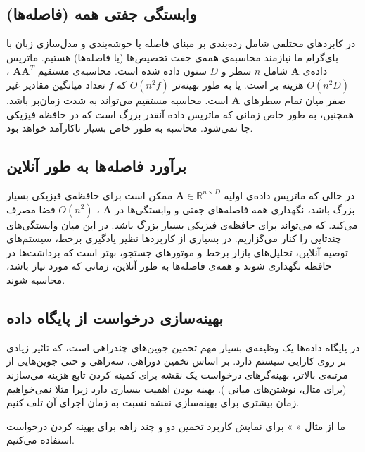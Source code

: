 \subsection{
وابستگی جفتی همه (فاصله‌ها)
}
در کابردهای مختلفی شامل رده‌بندی بر مبنای فاصله یا خوشه‌بندی و مدل‌سازی زبان با بای‌گرام%
\cite{litez48}
ما نیازمند محاسبه‌ی همه‌ی جفت تخصیص‌ها (یا فاصله‌ها) هستیم. ماتریس داده‌ی 
$\mathbf{A}$
شامل 
$n$
سطر و 
$D$
ستون داده شده است. محاسبه‌ی مستقیم
$\mathbf{AA}^T$
،
$O(n^2 D)$
هزینه بر است. یا به طور بهینه‌تر 
$O(n^2 \bar{f})$
که 
$\bar{f}$
تعداد میانگین مقادیر غیر صفر میان تمام سطرهای 
‌$\mathbf{A}$
است. محاسبه مستقیم می‌تواند به شدت زمان‌بر باشد. همچنین، به طور خاص زمانی که ماتریس داده آنقدر بزرگ است که در حافظه فیزیکی جا نمی‌شود. محاسبه به طور خاص بسیار ناکارآمد خواهد بود.

\subsection{
برآورد فاصله‌ها به طور آنلاین
}

در حالی که ماتریس داده‌ی اولیه 
$\mathbf{A} \in \mathbb{R}^{n \times D}$
ممکن است برای حافظه‌ی فیزیکی بسیار بزرگ باشد، نگهداری%
همه فاصله‌های جفتی و وابستگی‌ها در 
$\mathbf{A}$
،
$O(n^2)$
فضا مصرف می‌کند. که می‌تواند برای حافظه‌ی فیزیکی بسیار بزرگ باشد. در این میان وابستگی‌های چندتایی را کنار می‌گزاریم. در بسیاری از کاربردها نظیر یادگیری برخط، سیستم‌های توصیه آنلاین، تحلیل‌های بازار برخط و موتورهای جستجو، بهتر است که برداشت‌ها%
در حافظه نگهداری شوند و همه‌ی فاصله‌ها به طور آنلاین، زمانی که مورد نیاز باشد، محاسبه شوند.

\subsection{
بهینه‌سازی درخواست از پایگاه داده
}

در پایگاه داده‌ها یک وظیفه‌ی بسیار مهم تخمین جوین‌های%
چندراهی است، که تاثیر زیادی بر روی کارایی سیستم دارد.
\cite{litez81}
بر اساس تخمین دوراهی، سه‌راهی و حتی جوین‌هایی از مرتبه‌ی بالاتر، بهینه‌گرهای درخواست یک نقشه برای کمینه کردن تابع هزینه می‌سازند (برای مثال، نوشتن‌های میانی%
). بهینه بودن اهمیت بسیاری دارد زیرا مثلا نمی‌خواهیم زمان بیشتری برای بهینه‌سازی نقشه نسبت به زمان اجرای آن تلف کنیم.

ما از مثال «%
%
» برای نمایش کاربرد تخمین دو و چند راهه برای بهینه کردن درخواست استفاده می‌کنیم.

